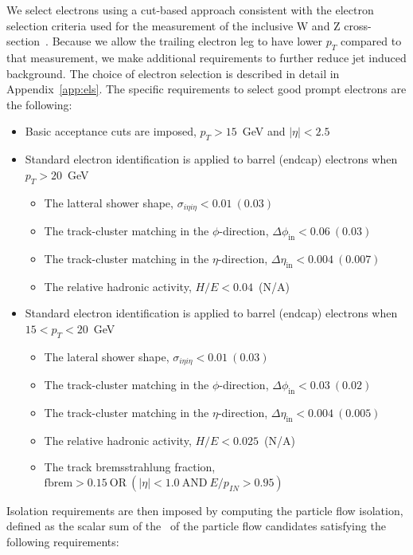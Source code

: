 We select electrons using a cut-based approach consistent with the electron 
selection criteria used for the measurement of the inclusive W and Z 
cross-section~\cite{VBTFCrossSectionNote}. 
Because we allow the trailing electron leg to have lower $p_T$ compared
to that measurement, we make additional requirements to further reduce
jet induced background.
The choice of electron selection is described in detail in Appendix~\ref{app:els}.
The specific requirements to select good prompt electrons are the following:

\begin{itemize}
    \item Basic acceptance cuts are imposed,  $p_T>15$~GeV and $|\eta| < 2.5$
    \item Standard electron identification is applied to barrel (endcap) electrons when $p_T>20$~GeV
    \begin{itemize}
        \item The latteral shower shape, $\sigma_{i\eta i\eta} < 0.01~(0.03)$
        \item The track-cluster matching in the $\phi$-direction, $\Delta \phi_{\mathrm{in}} < 0.06~(0.03)$
        \item The track-cluster matching in the $\eta$-direction, $\Delta \eta_{\mathrm{in}} < 0.004~(0.007)$
        \item The relative hadronic activity, $H/E<0.04$~(N/A)
    \end{itemize}
    \item Standard electron identification is applied to barrel (endcap) electrons when $15<p_T<20$~GeV
    \begin{itemize}
        \item The lateral shower shape, $\sigma_{i\eta i\eta} < 0.01~(0.03)$
        \item The track-cluster matching in the $\phi$-direction, $\Delta \phi_{\mathrm{in}} < 0.03~(0.02)$
        \item The track-cluster matching in the $\eta$-direction, $\Delta \eta_{\mathrm{in}} < 0.004~(0.005)$
        \item The relative hadronic activity, $H/E<0.025$~(N/A)
        \item The track bremsstrahlung fraction, $\mathrm{fbrem}>0.15~\mathrm{OR}~(|\eta|<1.0~\mathrm{AND}~E/p_{IN}>0.95)$
    \end{itemize}
\end{itemize}


Isolation requirements are then imposed by computing the particle flow isolation,
defined as the scalar sum of the \pt\ of the particle flow candidates satisfying 
the following requirements:

